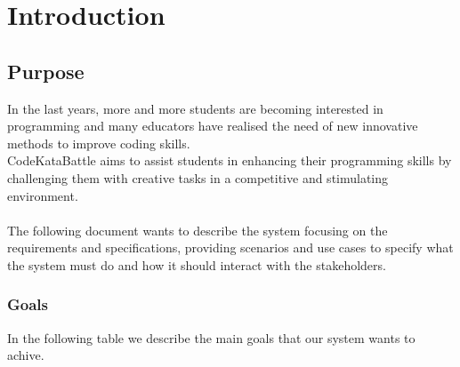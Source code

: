 \chapter{Introduction}

\section{Purpose}
In the last years, more and more students are becoming interested in programming and many educators have realised 
the need of new innovative methods to improve coding skills. \\
CodeKataBattle aims to assist students in enhancing their programming skills by challenging them with creative tasks
 in a competitive and stimulating environment. \\
 \\
 The following document wants to describe the system focusing on the requirements and specifications, providing scenarios 
 and use cases to specify what the system must do and how it should interact with the stakeholders.\\  

 \subsection{Goals}
 In the following table we describe the main goals that our system wants to achive.\\
 \begin{table}[H]
    \centering
    \end{table}
    \clearpage
